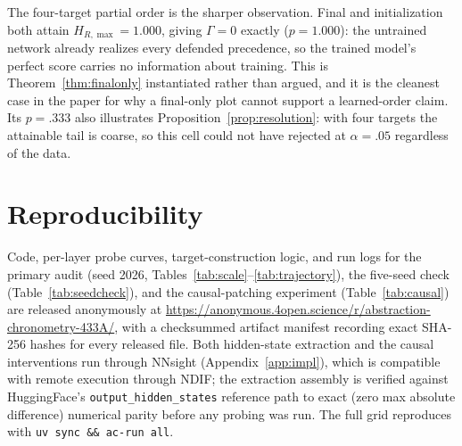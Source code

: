 \documentclass[11pt]{article}
\begin{document}
The four-target partial order is the sharper observation. Final and initialization both attain $H_{R,\max}=1.000$, giving $\Gamma=0$ exactly ($p=1.000$): the untrained network already realizes every defended precedence, so the trained model's perfect score carries no information about training. This is Theorem~\ref{thm:finalonly} instantiated rather than argued, and it is the cleanest case in the paper for why a final-only plot cannot support a learned-order claim. Its $p=.333$ also illustrates Proposition~\ref{prop:resolution}: with four targets the attainable tail is coarse, so this cell could not have rejected at $\alpha=.05$ regardless of the data.

\section{Reproducibility}
\label{app:repro}
Code, per-layer probe curves, target-construction logic, and run logs for the primary audit (seed 2026, Tables~\ref{tab:scale}--\ref{tab:trajectory}), the five-seed check (Table~\ref{tab:seedcheck}), and the causal-patching experiment (Table~\ref{tab:causal}) are released anonymously at \url{https://anonymous.4open.science/r/abstraction-chronometry-433A/}, with a checksummed artifact manifest recording exact SHA-256 hashes for every released file. Both hidden-state extraction and the causal interventions run through NNsight (Appendix~\ref{app:impl}), which is compatible with remote execution through NDIF; the extraction assembly is verified against HuggingFace's \texttt{output\_hidden\_states} reference path to exact (zero max absolute difference) numerical parity before any probing was run. The full grid reproduces with \texttt{uv sync \&\& ac-run all}.
\end{document}
